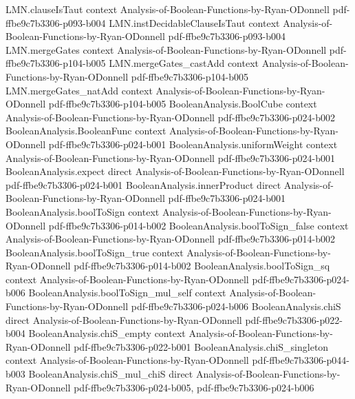 \begin{lemma}
  {LMN.clauseIsTaut}
  {context}
  {Analysis-of-Boolean-Functions-by-Ryan-ODonnell}
  {pdf-ffbe9c7b3306-p093-b004}
\proofstep
  {LMN.instDecidableClauseIsTaut}
  {context}
  {Analysis-of-Boolean-Functions-by-Ryan-ODonnell}
  {pdf-ffbe9c7b3306-p093-b004}
\proofstep
  {LMN.mergeGates}
  {context}
  {Analysis-of-Boolean-Functions-by-Ryan-ODonnell}
  {pdf-ffbe9c7b3306-p104-b005}
\proofstep
  {LMN.mergeGates_castAdd}
  {context}
  {Analysis-of-Boolean-Functions-by-Ryan-ODonnell}
  {pdf-ffbe9c7b3306-p104-b005}
\proofstep
  {LMN.mergeGates_natAdd}
  {context}
  {Analysis-of-Boolean-Functions-by-Ryan-ODonnell}
  {pdf-ffbe9c7b3306-p104-b005}
\proofstep
  {BooleanAnalysis.BoolCube}
  {context}
  {Analysis-of-Boolean-Functions-by-Ryan-ODonnell}
  {pdf-ffbe9c7b3306-p024-b002}
\proofstep
  {BooleanAnalysis.BooleanFunc}
  {context}
  {Analysis-of-Boolean-Functions-by-Ryan-ODonnell}
  {pdf-ffbe9c7b3306-p024-b001}
\proofstep
  {BooleanAnalysis.uniformWeight}
  {context}
  {Analysis-of-Boolean-Functions-by-Ryan-ODonnell}
  {pdf-ffbe9c7b3306-p024-b001}
\proofstep
  {BooleanAnalysis.expect}
  {direct}
  {Analysis-of-Boolean-Functions-by-Ryan-ODonnell}
  {pdf-ffbe9c7b3306-p024-b001}
\proofstep
  {BooleanAnalysis.innerProduct}
  {direct}
  {Analysis-of-Boolean-Functions-by-Ryan-ODonnell}
  {pdf-ffbe9c7b3306-p024-b001}
\proofstep
  {BooleanAnalysis.boolToSign}
  {context}
  {Analysis-of-Boolean-Functions-by-Ryan-ODonnell}
  {pdf-ffbe9c7b3306-p014-b002}
\proofstep
  {BooleanAnalysis.boolToSign_false}
  {context}
  {Analysis-of-Boolean-Functions-by-Ryan-ODonnell}
  {pdf-ffbe9c7b3306-p014-b002}
\proofstep
  {BooleanAnalysis.boolToSign_true}
  {context}
  {Analysis-of-Boolean-Functions-by-Ryan-ODonnell}
  {pdf-ffbe9c7b3306-p014-b002}
\proofstep
  {BooleanAnalysis.boolToSign_sq}
  {context}
  {Analysis-of-Boolean-Functions-by-Ryan-ODonnell}
  {pdf-ffbe9c7b3306-p024-b006}
\proofstep
  {BooleanAnalysis.boolToSign_mul_self}
  {context}
  {Analysis-of-Boolean-Functions-by-Ryan-ODonnell}
  {pdf-ffbe9c7b3306-p024-b006}
\proofstep
  {BooleanAnalysis.chiS}
  {direct}
  {Analysis-of-Boolean-Functions-by-Ryan-ODonnell}
  {pdf-ffbe9c7b3306-p022-b004}
\proofstep
  {BooleanAnalysis.chiS_empty}
  {context}
  {Analysis-of-Boolean-Functions-by-Ryan-ODonnell}
  {pdf-ffbe9c7b3306-p022-b001}
\proofstep
  {BooleanAnalysis.chiS_singleton}
  {context}
  {Analysis-of-Boolean-Functions-by-Ryan-ODonnell}
  {pdf-ffbe9c7b3306-p044-b003}
\proofstep
  {BooleanAnalysis.chiS_mul_chiS}
  {direct}
  {Analysis-of-Boolean-Functions-by-Ryan-ODonnell}
  {pdf-ffbe9c7b3306-p024-b005,
    pdf-ffbe9c7b3306-p024-b006}
\proofstep

\end{lemma}

